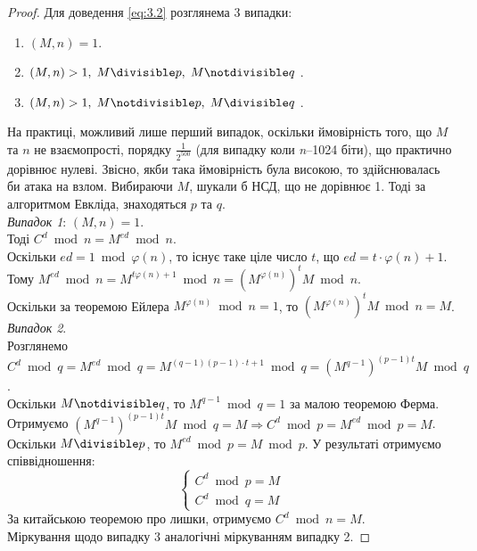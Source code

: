 \begin{proof}
Для доведення \eqref{eq:3.2} розглянема 3 випадки:

\begin{enumerate}
\item $(M,n) = 1$.
\item $(M,n) > 1, \; M\divisible p, \; M \notdivisible q$ .
\item $(M,n) > 1, \; M \notdivisible p, \; M \divisible q$ .
\end{enumerate}

На практиці, можливий лише перший випадок, оскільки ймовірність того, що $M$ та $n$ не взаємопрості, порядку $\frac{1}{2^{500}}$ (для випадку коли \textsl{n}--1024 біти), що практично дорівнює нулеві.
Звісно, якби така ймовірність була високою, то здійснювалась би атака на взлом. Вибираючи $M$, шукали б НСД, що не дорівнює 1. Тоді за алгоритмом Евкліда, знаходяться $p$ та $q$. \\

\textit{Випадок 1}: $(M,n) = 1$. \\
Тоді $C ^ d \bmod n = M ^ {ed} \bmod n$. \\
Оскільки $ed = 1 \bmod \varphi (n)$, то існує таке ціле число $t$, що $ed = t \cdot \varphi (n) + 1 $. \\
Тому $M ^ {ed} \bmod n = M ^ {t \varphi (n) + 1} \bmod n = (M ^ {\varphi (n)})^ t  M \bmod n$.\\
 Оскільки за теоремою Ейлера $M ^ {\varphi (n)} \bmod n = 1$, то $(M ^ {\varphi (n)})^ t  M \bmod n = M$.\\
 
\textit{Випадок 2}.\\
 Розглянемо $C ^ d \bmod q = M ^ {ed} \bmod q = M ^ {(q-1)(p-1) \cdot t + 1} \bmod q = (M ^ {q-1}) ^ {(p-1)t}M \bmod q$.\\ Оскільки $M \notdivisible q$, то $M ^ {q-1} \bmod q = 1$ за малою теоремою Ферма. \\
Отримуємо $(M ^ {q-1}) ^ {(p-1)t}M \bmod q = M \Rightarrow C ^ d \bmod p = M ^{ed} \bmod p = M$. \\
Оскільки $M \divisible p$, то $M ^{ed} \bmod p = M \bmod p$. У результаті отримуємо співвідношення:
\begin{equation*}
\begin{cases}
    C ^ d \bmod p = M \\
    C ^ d \bmod q = M
\end{cases}
\end{equation*}
За китайською теоремою про лишки, отримуємо $C ^ d \bmod n = M$.\\
Міркування щодо випадку 3 аналогічні міркуванням випадку 2.
\end{proof}

